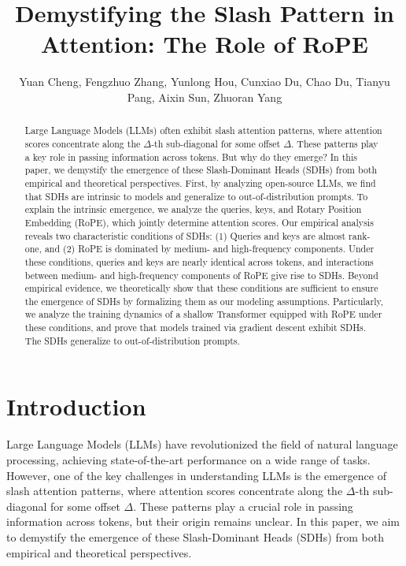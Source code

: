 \documentclass{article}
\begin{document}
\title{Demystifying the Slash Pattern in Attention: The Role of RoPE}
\author{Yuan Cheng, Fengzhuo Zhang, Yunlong Hou, Cunxiao Du, Chao Du, Tianyu Pang, Aixin Sun, Zhuoran Yang}

\maketitle

\begin{abstract}
Large Language Models (LLMs) often exhibit slash attention patterns, where attention scores concentrate along the $Δ$-th sub-diagonal for some offset $Δ$. These patterns play a key role in passing information across tokens. But why do they emerge? In this paper, we demystify the emergence of these Slash-Dominant Heads (SDHs) from both empirical and theoretical perspectives. First, by analyzing open-source LLMs, we find that SDHs are intrinsic to models and generalize to out-of-distribution prompts. To explain the intrinsic emergence, we analyze the queries, keys, and Rotary Position Embedding (RoPE), which jointly determine attention scores. Our empirical analysis reveals two characteristic conditions of SDHs: (1) Queries and keys are almost rank-one, and (2) RoPE is dominated by medium- and high-frequency components. Under these conditions, queries and keys are nearly identical across tokens, and interactions between medium- and high-frequency components of RoPE give rise to SDHs. Beyond empirical evidence, we theoretically show that these conditions are sufficient to ensure the emergence of SDHs by formalizing them as our modeling assumptions. Particularly, we analyze the training dynamics of a shallow Transformer equipped with RoPE under these conditions, and prove that models trained via gradient descent exhibit SDHs. The SDHs generalize to out-of-distribution prompts.
\end{abstract}

\section{Introduction}

Large Language Models (LLMs) have revolutionized the field of natural language processing, achieving state-of-the-art performance on a wide range of tasks. However, one of the key challenges in understanding LLMs is the emergence of slash attention patterns, where attention scores concentrate along the $Δ$-th sub-diagonal for some offset $Δ$. These patterns play a crucial role in passing information across tokens, but their origin remains unclear. In this paper, we aim to demystify the emergence of these Slash-Dominant Heads (SDHs) from both empirical and theoretical perspectives.
\end{document}
